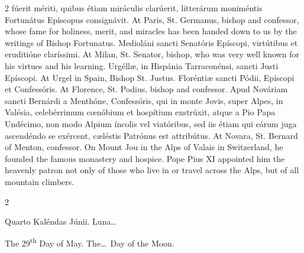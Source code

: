 \begin{paracol}{2}
 fúerit mériti, quibus étiam miráculis clarúerit, litterárum moniméntis 
 Fortunátus Epíscopus consignávit.
\switchcolumn
{}
At Paris, St. Germanus, bishop and 
 confessor, whose fame for holiness, merit, and miracles has been handed down 
 to us by the writings of Bishop Fortunatus.
\switchcolumn*
{}
Medioláni sancti 
 Senatóris Epíscopi, virtútibus et eruditióne claríssimi.
\switchcolumn
{}
At Milan, St. Senator, bishop, who 
 was very well known for his virtues and his learning.
\switchcolumn*
{}
Urgéllæ, in Hispánia 
 Tarraconénsi, sancti Justi Epíscopi.
\switchcolumn
{}
At Urgel in Spain, Bishop St. 
 Justus.
\switchcolumn*
{}
Floréntiæ sancti Pódii, 
 Epíscopi et Confessóris.
\switchcolumn
{}
At Florence, St. Podius, bishop and 
 confessor.
\switchcolumn*
{}
Apud Nováriam sancti 
 Bernárdi a Menthóne, Confessóris, qui in monte Jovis, super Alpes, in 
 Valésia, celebérrimum cœnóbium et hospítium exstrúxit, atque a Pio Papa 
 Undécimo, non modo Alpium íncolis vel viatóribus, sed iis étiam qui eárum 
 juga ascendéndo se exércent, cæléstis Patrónus est attribútus.
\switchcolumn
{}
At Novara, St. Bernard of Menton, 
 confessor. On Mount Jou in the Alps of Valais in Switzerland, he 
 founded the famous monastery and hospice. Pope Pius XI appointed him 
 the heavenly patron not only of those who live in or travel across the Alps, 
 but of all mountain climbers.
\switchcolumn*
{}
\end{paracol}


\begin{paracol}{2}
\begin{center}{\color{gregoriocolor} Quarto Kaléndas Júnii. 
 Luna\dots\ }\end{center}
\switchcolumn
{}
\begin{center}{\color{gregoriocolor} The 
 29\textsuperscript{th} Day of May. The\dots\ Day of the Moon.}\end{center}
\end{paracol}

